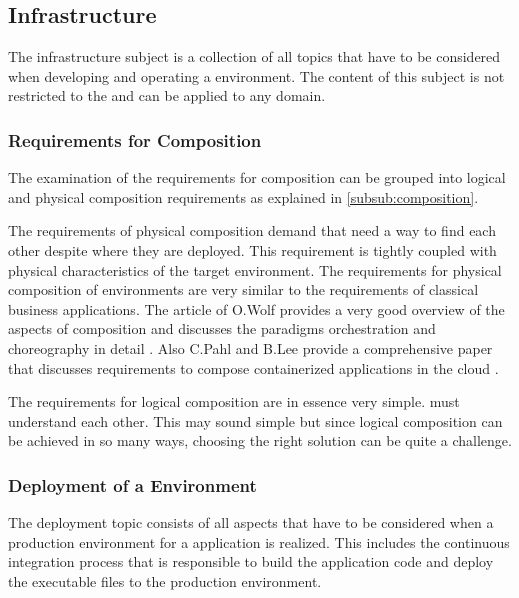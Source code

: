 \subsection{\ms{} Infrastructure}
\label{sub:infrastructure}

The \ms{} infrastructure subject is a collection of all topics that have to be
considered when developing and operating a \ms{} environment. The content of
this subject is not restricted to the \ogs{} and can be applied to any domain.

\subsubsection{Requirements for \ms{} Composition}

The examination of the requirements for \ms{} composition can be grouped into
logical and physical composition requirements as explained in
\autoref{subsub:composition}.

The requirements of physical composition demand that \mss{} need a way to find
each other despite where they are deployed. This requirement is tightly coupled
with physical characteristics of the target environment. The requirements for
physical composition of \ms{} \og{} environments are very similar to the
requirements of classical business applications. The article of O.Wolf provides
a very good overview of the aspects of \ms{} composition and discusses the
paradigms orchestration and choreography in detail \cite{wolf_ms}. Also C.Pahl
and B.Lee provide a comprehensive paper that discusses requirements to compose
containerized applications in the cloud \cite{pahl2015containers}.

The requirements for logical composition are in essence very simple. \mss{} must
understand each other. This may sound simple but since logical composition can
be achieved in so many ways, choosing the right solution can be quite a
challenge.

\subsubsection{Deployment of a \ms{} Environment}

The deployment topic consists of all aspects that have to be considered when a
production environment for a \ms{} application is realized. This includes the
continuous integration process that is responsible to build the application code
and deploy the executable files to the production environment.

